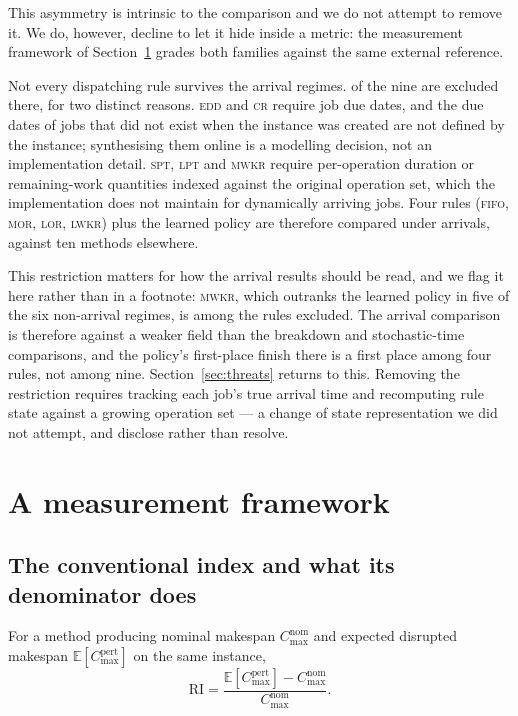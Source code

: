 \documentclass[a4paper,fleqn]{cas-sc}
\newcommand{\Cmax}{C_{\max}}
\newcommand{\RI}{\mathrm{RI}}
\begin{document}
This asymmetry is intrinsic to the comparison and we do not attempt to remove
it. We do, however, decline to let it hide inside a metric: the measurement
framework of Section~\ref{sec:framework} grades both families against the same
external reference.

Not every dispatching rule survives the arrival regimes. \NExcludedArr{} of the
nine are excluded there, for two distinct reasons. \textsc{edd} and \textsc{cr}
require job due dates, and the due dates of jobs that did not exist when the
instance was created are not defined by the instance; synthesising them online
is a modelling decision, not an implementation detail. \textsc{spt},
\textsc{lpt} and \textsc{mwkr} require per-operation duration or
remaining-work quantities indexed against the original operation set, which the
implementation does not maintain for dynamically arriving jobs. Four rules
(\textsc{fifo}, \textsc{mor}, \textsc{lor}, \textsc{lwkr}) plus the learned
policy are therefore compared under arrivals, against ten methods elsewhere.

This restriction matters for how the arrival results should be read, and we flag
it here rather than in a footnote: \textsc{mwkr}, which outranks the learned
policy in five of the six non-arrival regimes, is among the rules excluded. The
arrival comparison is therefore against a weaker field than the breakdown and
stochastic-time comparisons, and the policy's first-place finish there is a
first place among four rules, not among nine. Section~\ref{sec:threats} returns
to this. Removing the restriction requires tracking each job's true arrival time
and recomputing rule state against a growing operation set --- a change of state
representation we did not attempt, and disclose rather than resolve.

\section{A measurement framework}\label{sec:framework}

\subsection{The conventional index and what its denominator does}

\begin{definition}\label{def:ri}
For a method producing nominal makespan $\Cmax^{\text{nom}}$ and expected
disrupted makespan $\mathbb{E}[\Cmax^{\text{pert}}]$ on the same instance,
\[
  \RI=\frac{\mathbb{E}[\Cmax^{\text{pert}}]-\Cmax^{\text{nom}}}{\Cmax^{\text{nom}}}.
\]
\end{definition}
\end{document}
